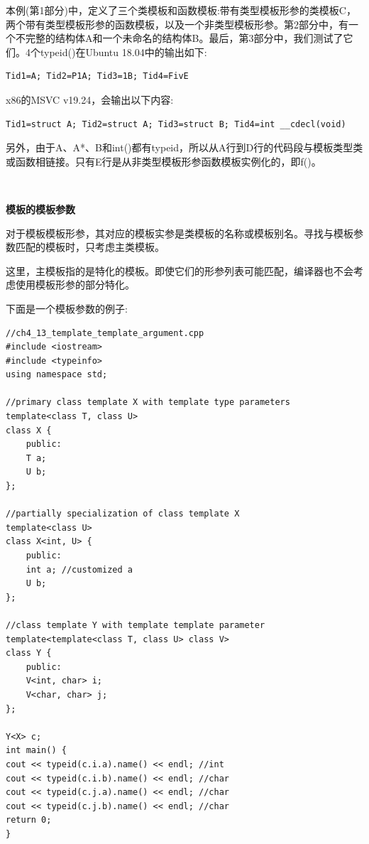 本例(第1部分)中，定义了三个类模板和函数模板:带有类型模板形参的类模板C，两个带有类型模板形参的函数模板，以及一个非类型模板形参。第2部分中，有一个不完整的结构体A和一个未命名的结构体B。最后，第3部分中，我们测试了它们。4个typeid()在Ubuntu 18.04中的输出如下: \par

\begin{lstlisting}[caption={}]
Tid1=A; Tid2=P1A; Tid3=1B; Tid4=FivE
\end{lstlisting}

x86的MSVC v19.24，会输出以下内容: \par

\begin{lstlisting}[caption={}]
Tid1=struct A; Tid2=struct A; Tid3=struct B; Tid4=int __cdecl(void)
\end{lstlisting}

另外，由于A、A*、B和int()都有typeid，所以从A行到D行的代码段与模板类型类或函数相链接。只有E行是从非类型模板形参函数模板实例化的，即f()。 \par

\noindent\textbf{}\ \par
\textbf{模板的模板参数} \ \par
对于模板模板形参，其对应的模板实参是类模板的名称或模板别名。寻找与模板参数匹配的模板时，只考虑主类模板。 \par
这里，主模板指的是特化的模板。即使它们的形参列表可能匹配，编译器也不会考虑使用模板形参的部分特化。 \par
下面是一个模板参数的例子: \par

\begin{lstlisting}[caption={}]
//ch4_13_template_template_argument.cpp
#include <iostream>
#include <typeinfo>
using namespace std;

//primary class template X with template type parameters
template<class T, class U>
class X {
	public:
	T a;
	U b;
};

//partially specialization of class template X
template<class U>
class X<int, U> {
	public:
	int a; //customized a
	U b;
};

//class template Y with template template parameter
template<template<class T, class U> class V>
class Y {
	public:
	V<int, char> i;
	V<char, char> j;
};

Y<X> c;
int main() {
cout << typeid(c.i.a).name() << endl; //int
cout << typeid(c.i.b).name() << endl; //char
cout << typeid(c.j.a).name() << endl; //char
cout << typeid(c.j.b).name() << endl; //char
return 0;
}
\end{lstlisting}

